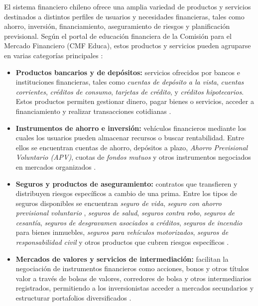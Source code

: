\documentclass[
	spanish, %
	letterpaper, oneside
]{book}
\begin{document}
El sistema financiero chileno ofrece una amplia variedad de productos y servicios destinados a distintos perfiles de usuarios y necesidades financieras, tales como ahorro, inversión, financiamiento, aseguramiento de riesgos y planificación previsional. Según el portal de educación financiera de la Comisión para el Mercado Financiero (CMF Educa), estos productos y servicios pueden agruparse en varias categorías principales \cite{cmf_educa_sistema, cmf_productos_bancarios, cmf_tipos_seguros, cmf_apv}:

\begin{itemize}
    \item \textbf{Productos bancarios y de depósitos:} servicios ofrecidos por bancos e instituciones financieras, tales como \emph{cuentas de depósito a la vista}, \emph{cuentas corrientes}, \emph{créditos de consumo}, \emph{tarjetas de crédito}, y \emph{créditos hipotecarios}. Estos productos permiten gestionar dinero, pagar bienes o servicios, acceder a financiamiento y realizar transacciones cotidianas \cite{cmf_productos_bancarios}.
    
    \item \textbf{Instrumentos de ahorro e inversión:} vehículos financieros mediante los cuales los usuarios pueden almacenar recursos o buscar rentabilidad. Entre ellos se encuentran cuentas de ahorro, depósitos a plazo, \emph{Ahorro Previsional Voluntario (APV)}, cuotas de \emph{fondos mutuos} y otros instrumentos negociados en mercados organizados \cite{cmf_educa_sistema}.
    
    \item \textbf{Seguros y productos de aseguramiento:} contratos que transfieren y distribuyen riesgos específicos a cambio de una prima. Entre los tipos de seguros disponibles se encuentran \emph{seguro de vida}, \emph{seguro con ahorro previsional voluntario }, \emph{seguros de salud}, \emph{seguros contra robo}, \emph{seguros de cesantía}, \emph{seguros de desgravamen asociados a créditos}, \emph{seguros de incendio} para bienes inmuebles, \emph{seguros para vehículos motorizados}, \emph{seguros de responsabilidad civil} y otros productos que cubren riesgos específicos \cite{cmf_tipos_seguros}.
    
    \item \textbf{Mercados de valores y servicios de intermediación:} facilitan la negociación de instrumentos financieros como acciones, bonos y otros títulos valor a través de bolsas de valores, corredores de bolsa y otros intermediarios registrados, permitiendo a los inversionistas acceder a mercados secundarios y estructurar portafolios diversificados \cite{cmf_educa_sistema}.
    
\end{itemize}
\end{document}
